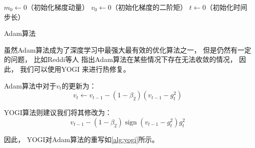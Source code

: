 \begin{algorithm}
    \KwData{$\beta_1,\beta_2\in [0,1)$：非负加权参数}
    $m_0\leftarrow0$（初始化梯度动量）\;
    $v_0\leftarrow0$（初始化梯度的二阶矩）\;
    $t\leftarrow0$（初始化时间步长）\;
    \caption{Adam算法}
    \label{alg:adam}
\end{algorithm}

虽然Adam算法成为了深度学习中最强大最有效的优化算法之一，
但是仍然有一定的问题，
比如Reddi等人\cite{reddiConvergenceAdam2019}
指出Adam算法在某些情况下存在无法收敛的情况，
因此，
我们可以使用YOGI\cite{zaheerAdaptiveMethodsNonconvex2018}
来进行热修复。

Adam算法中对于$v_t$的更新为：
\begin{equation}
    v_t \leftarrow v_{t-1}-\left(1-\beta_{2}\right)\left(v_{t-1}-g_{t}^{2}\right)
\end{equation}

YOGI算法则建议我们将其修改为：
\begin{equation}
    v_{t-1}-\left(1-\beta_{2}\right) \operatorname{sign}\left(v_{t-1}-g_{t}^{2}\right) g_{t}^{2}
\end{equation}

因此，
YOGI对Adam算法的重写如\cref{alg:yogi}所示。

